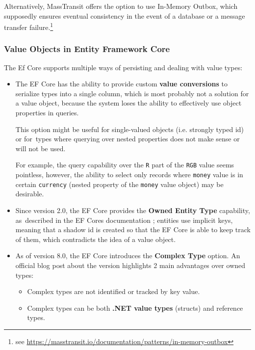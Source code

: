 Alternatively, MassTransit offers the option to use In-Memory Outbox, which supposedly ensures eventual consistency in the event of a database or a message transfer failure.\footnote{see \url{https://masstransit.io/documentation/patterns/in-memory-outbox}}

\subsubsection{Value Objects in Entity Framework Core}
The Ef Core supports multiple ways of persisting and dealing with value types:

\begin{itemize}
    \item The EF Core has the ability to provide custom \textbf{value conversions} to serialize types into a single column, which is most probably not a solution for a value object, because the system loses the ability to effectively use object properties in queries. 

    This option might be useful for single-valued objects (i.e. strongly typed id) or for~types where querying over nested properties does not make sense or will not be used.
    
    For example, the query capability over the \texttt{R} part of  the \texttt{RGB} value seems pointless, however, the ability to select only records where \texttt{money} value is in certain \texttt{currency} (nested property of the \texttt{money} value object) may be desirable.
    
    \item Since version 2.0, the EF Core provides the \textbf{Owned Entity Type} capability, as~described in the EF Cores documentation \cite{ms:efcore:owned_types}; entities use implicit keys, meaning that a shadow id is created so that the EF Core is able to keep track of them, which contradicts the idea of a value object.
    
    \item As of version 8.0, the EF Core introduces the \textbf{Complex Type} option. An official blog post about the version \cite{ms:blog:complex_types} highlights 2 main advantages over owned types:
    \begin{itemize}
        \item Complex types are not identified or tracked by key value.
        \item Complex types can be both \textbf{.NET value types} (structs) and reference types.
    \end{itemize}
\end{itemize}

